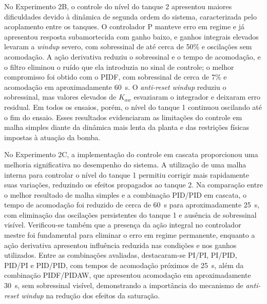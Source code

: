 \documentclass[a4paper,12pt]{article}
\begin{document}
\begin{justify}
    \hspace{4ex}No Experimento 2B, o controle do nível do tanque 2 apresentou maiores dificuldades devido à dinâmica de segunda ordem do sistema, caracterizada pelo acoplamento entre os tanques. O controlador P manteve erro em regime e já apresentou resposta subamortecida com ganho baixo, e ganhos integrais elevados levaram a \textit{windup} severo, com sobressinal de até cerca de 50\% e oscilações sem acomodação. A ação derivativa reduziu o sobressinal e o tempo de acomodação, e o filtro eliminou o ruído que ela introduzia no sinal de controle; o melhor compromisso foi obtido com o PIDF, com sobressinal de cerca de 7\% e acomodação em aproximadamente 60~s. O \textit{anti-reset windup} reduziu o sobressinal, mas valores elevados de $K_{aw}$ esvaziaram o integrador e deixaram erro residual. Em todos os ensaios, porém, o nível do tanque 1 continuou oscilando até o fim do ensaio. Esses resultados evidenciaram as limitações do controle em malha simples diante da dinâmica mais lenta da planta e das restrições físicas impostas à atuação da bomba.
\end{justify}

\begin{justify}
    \hspace{4ex}No Experimento 2C, a implementação do controle em cascata proporcionou uma melhoria significativa no desempenho do sistema. A utilização de uma malha interna para controlar o nível do tanque 1 permitiu corrigir mais rapidamente suas variações, reduzindo os efeitos propagados ao tanque 2. Na comparação entre o melhor resultado de malha simples e a combinação PID/PID em cascata, o tempo de acomodação foi reduzido de cerca de 60~s para aproximadamente 25~s, com eliminação das oscilações persistentes do tanque 1 e ausência de sobressinal visível. Verificou-se também que a presença da ação integral no controlador mestre foi fundamental para eliminar o erro em regime permanente, enquanto a ação derivativa apresentou influência reduzida nas condições e nos ganhos utilizados. Entre as combinações avaliadas, destacaram-se PI/PI, PI/PID, PID/PI e PID/PID, com tempos de acomodação próximos de 25~s, além da combinação PIDF/PIDAW, que apresentou acomodação em aproximadamente 30~s, sem sobressinal visível, demonstrando a importância do mecanismo de \textit{anti-reset windup} na redução dos efeitos da saturação.
\end{justify}
\end{document}
